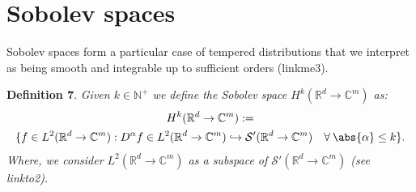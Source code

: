 \documentclass[
]{article}
\begin{document}
\hypertarget{sobolev-spaces}{%
\section{Sobolev spaces}\label{sobolev-spaces}}

Sobolev spaces form a particular case of tempered distributions that we
interpret as being smooth and integrable up to sufficient orders
(linkme3).

\leavevmode{}%
\textbf{Definition 7}. \emph{Given \(k\in\mathbb{N}^+\) we define the
\emph{Sobolev space} \(H^k({\mathbb R}^d\to\mathbb{C}^m)\) as:
\[\begin{gathered}
        H^k({\mathbb R}^d\to\mathbb{C}^m):=\\ \lbrace f\in L^2({\mathbb R}^d\to\mathbb{C}^m): D^\alpha f\in L^2({\mathbb R}^d\to\mathbb{C}^m)\hookrightarrow{\mathcal S}'({\mathbb R}^d\to\mathbb{C}^m)\quad\forall\hspace{2pt}\abs{\alpha}\leq k\rbrace.
    \end{gathered}\] Where, we consider
\(L^2({\mathbb R}^d\to\mathbb{C}^m)\) as a subspace of
\({\mathcal S}'({\mathbb R}^d\to\mathbb{C}^m)\) (see linkto2).}
\end{document}
